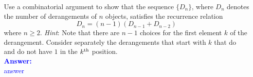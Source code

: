 \item{}
Use a combinatorial argument to show that the sequence $\{D_n\}$, where $D_n$
denotes the number of derangements of $n$ objects, satisfies the recurrence
relation $$D_n=(n-1)(D_{n-1}+D_{n-2})$$ where $n\ge2$.\parend
\emph{Hint}\/: Note that there are $n-1$ choices for the first element $k$ of
the derangement. Consider separately the derangements that start with $k$ that
do and do not have $1$ in the $k^{\rm th}$ position.\\[12pt]
\ifanswers
\textcolor{blue}{
\textbf{Answer:}\\[6pt]
answer
}
\newpage
\fi
